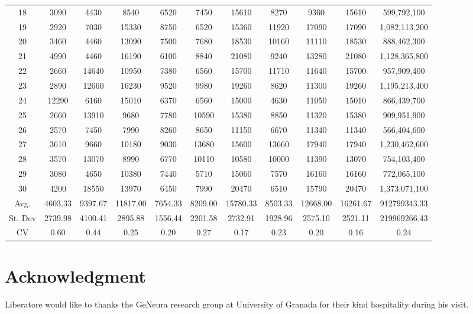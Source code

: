 \documentclass[journal]{IEEEtran}
\begin{document}
\begin{table}
\begin{tabular}{|c|cccccccc|cc|}
18	&	3090	&	4430	&	8540	&	6520	&	7450	&	15610	&	8270	&	9360	&	15610	&	599,792,100	\\
19	&	2920	&	7030	&	15330	&	8750	&	6520	&	15360	&	11920	&	17090	&	17090	&	1,082,113,200	\\
20	&	3460	&	4460	&	13090	&	7500	&	7680	&	18530	&	10160	&	11110	&	18530	&	888,462,300	\\
21	&	4990	&	4460	&	16190	&	6100	&	8840	&	21080	&	9240	&	13280	&	21080	&	1,128,365,800	\\
22	&	2660	&	14640	&	10950	&	7380	&	6560	&	15700	&	11710	&	11640	&	15700	&	957,909,400	\\
23	&	2890	&	12660	&	16230	&	9520	&	9980	&	19260	&	8620	&	11300	&	19260	&	1,195,213,400	\\
24	&	12290	&	6160	&	15010	&	6370	&	6560	&	15000	&	4630	&	11050	&	15010	&	866,439,700	\\
25	&	2660	&	13910	&	9680	&	7780	&	10590	&	15380	&	8850	&	11320	&	15380	&	909,951,900	\\
26	&	2570	&	7450	&	7990	&	8260	&	8650	&	11150	&	6670	&	11340	&	11340	&	566,404,600	\\
27	&	3610	&	9660	&	10180	&	9030	&	13680	&	15600	&	13660	&	17940	&	17940	&	1,230,462,600	\\
28	&	3570	&	13070	&	8990	&	6770	&	10110	&	10580	&	10000	&	11390	&	13070	&	754,103,400	\\
29	&	3080	&	4650	&	10380	&	7440	&	5710	&	15060	&	7570	&	16160	&	16160	&	772,065,100	\\
30	&	4200	&	18550	&	13970	&	6450	&	7990	&	20470	&	6510	&	15790	&	20470	&	1,373,071,100	\\
\hline
Avg.	&	4603.33	&	9397.67	&	11817.00	&	7654.33	&	8209.00	&	15780.33	&	8503.33	&	12668.00	&	16261.67	&	912799343.33	\\
St. Dev	&	2739.98	&	4100.41	&	2895.88	&	1556.44	&	2201.58	&	2732.91	&	1928.96	&	2575.10	&	2521.11	&	219969266.43	\\
CV	&	0.60	&	0.44	&	0.25	&	0.20	&	0.27	&	0.17	&	0.23	&	0.20	&	0.16	&	0.24	\\
\hline
\end{tabular}
\end{table}


\section*{Acknowledgment}
Liberatore would like to thanks the GeNeura research group at
University of Granada for their kind hospitality during his visit.
\end{document}
